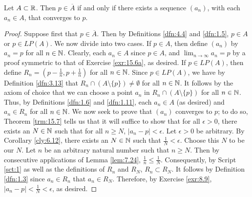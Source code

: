 \documentclass[../main.tex]{subfiles}
\begin{document}
\begin{theorem}\label{trm:15.11}
    Let $A\subset\mathbb{R}$. Then $p\in\overline{A}$ if and only if there exists a sequence $(a_n)$, with each $a_n\in A$, that converges to $p$.
    \begin{proof}

        Suppose first that $p\in\overline{A}$. Then by Definitions \ref{dfn:4.4} and \ref{dfn:1.5}, $p\in A$ or $p\in LP(A)$. We now divide into two cases. If $p\in A$, then define $(a_n)$ by $a_n=p$ for all $n\in\mathbb{N}$. Clearly, each $a_n\in A$ since $p\in A$, and $\lim_{n\to\infty}a_n=p$ by a proof symmetric to that of Exercise \ref{exr:15.6a}, as desired. If $p\in LP(A)$, then define $R_n=(p-\frac{1}{n},p+\frac{1}{n})$ for all $n\in\mathbb{N}$. Since $p\in LP(A)$, we have by Definition \ref{dfn:3.13} that $R_n\cap(A\setminus\{p\})\neq\emptyset$ for all $n\in\mathbb{N}$. It follows by the axiom of choice that we can choose a point $a_n$ in $R_n\cap(A\setminus\{p\})$ for all $n\in\mathbb{N}$. Thus, by Definitions \ref{dfn:1.6} and \ref{dfn:1.11}, each $a_n\in A$ (as desired) and $a_n\in R_n$ for all $n\in\mathbb{N}$. We now seek to prove that $(a_n)$ converges to $p$; to do so, Theorem \ref{trm:15.7} tells us that it will suffice to show that for all $\epsilon>0$, there exists an $N\in\mathbb{N}$ such that for all $n\geq N$, $|a_n-p|<\epsilon$. Let $\epsilon>0$ be arbitrary. By Corollary \ref{cly:6.12}, there exists an $N\in\mathbb{N}$ such that $\frac{1}{N}<\epsilon$. Choose this $N$ to be our $N$. Let $n$ be an arbitrary natural number such that $n\geq N$. Then by consecutive applications of Lemma \ref{lem:7.24}, $\frac{1}{n}\leq\frac{1}{N}$. Consequently, by Script \ref{sct:1} as well as the definitions of $R_n$ and $R_N$, $R_n\subset R_N$. It follows by Definition \ref{dfn:1.3} since $a_n\in R_n$ that $a_n\in R_N$. Therefore, by Exercise \ref{exr:8.9}, $|a_n-p|<\frac{1}{N}<\epsilon$, as desired.\par

\end{proof}
\end{theorem}
\end{document}
